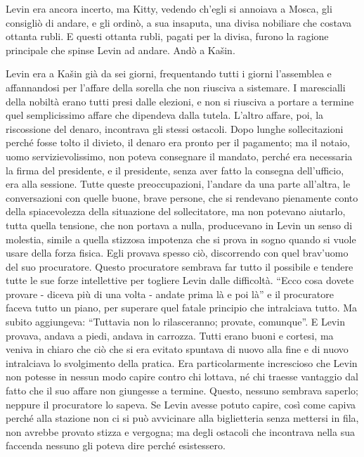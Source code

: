 Levin era ancora incerto, ma Kitty, vedendo ch'egli si annoiava a Mosca, gli consigliò di andare, e gli ordinò, a sua insaputa, una divisa nobiliare che costava ottanta rubli. E questi ottanta rubli, pagati per la divisa, furono la ragione principale che spinse Levin ad andare. Andò a Kašin. 

Levin era a Kašin già da sei giorni, frequentando tutti i giorni l'assemblea e affannandosi per l'affare della sorella che non riusciva a sistemare. I marescialli della nobiltà erano tutti presi dalle elezioni, e non si riusciva a portare a termine quel semplicissimo affare che dipendeva dalla tutela. L'altro affare, poi, la riscossione del denaro, incontrava gli stessi ostacoli. Dopo lunghe sollecitazioni perché fosse tolto il divieto, il denaro era pronto per il pagamento; ma il notaio, uomo servizievolissimo, non poteva consegnare il mandato, perché era necessaria la firma del presidente, e il presidente, senza aver fatto la consegna dell'ufficio, era alla sessione. Tutte queste preoccupazioni, l'andare da una parte all'altra, le conversazioni con quelle buone, brave persone, che si rendevano pienamente conto della spiacevolezza della situazione del sollecitatore, ma non potevano aiutarlo, tutta quella tensione, che non portava a nulla, producevano in Levin un senso di molestia, simile a quella stizzosa impotenza che si prova in sogno quando si vuole usare della forza fisica. Egli provava spesso ciò, discorrendo con quel brav'uomo del suo procuratore. Questo procuratore sembrava far tutto il possibile e tendere tutte le sue forze intellettive per togliere Levin dalle difficoltà. ``Ecco cosa dovete provare - diceva più di una volta - andate prima là e poi là'' e il procuratore faceva tutto un piano, per superare quel fatale principio che intralciava tutto. Ma subito aggiungeva: ``Tuttavia non lo rilasceranno; provate, comunque''. E Levin provava, andava a piedi, andava in carrozza. Tutti erano buoni e cortesi, ma veniva in chiaro che ciò che si era evitato spuntava di nuovo alla fine e di nuovo intralciava lo svolgimento della pratica. Era particolarmente increscioso che Levin non potesse in nessun modo capire contro chi lottava, né chi traesse vantaggio dal fatto che il suo affare non giungesse a termine. Questo, nessuno sembrava saperlo; neppure il procuratore lo sapeva. Se Levin avesse potuto capire, così come capiva perché alla stazione non ci si può avvicinare alla biglietteria senza mettersi in fila, non avrebbe provato stizza e vergogna; ma degli ostacoli che incontrava nella sua faccenda nessuno gli poteva dire perché esistessero. 

